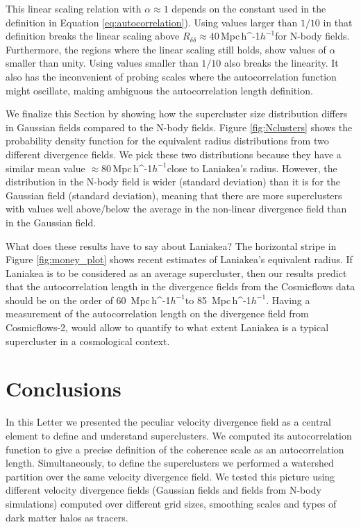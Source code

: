 \documentclass[usenatbib]{mnras}
\newcommand{\Mpch}{\,{\rm Mpc}\,\ifmmode h^{-1}\else $h^{-1}$\fi}
\begin{document}
This linear scaling relation with $\alpha\approx 1$ depends on the constant used in the definition in Equation \ref{eq:autocorrelation}). 
Using values larger than $1/10$ in that definition breaks the linear scaling above $R_{\delta\delta}\approx 40$\Mpch for N-body fields. 
Furthermore, the regions where the linear scaling still holds, show values of $\alpha$ smaller than unity. 
Using values smaller than $1/10$ also breaks the linearity. 
It also has the inconvenient of probing scales where the autocorrelation function might oscillate, making ambiguous the autocorrelation length definition.
    
We finalize this Section by showing how the supercluster size distribution differs in Gaussian fields compared to the N-body fields.
Figure \ref{fig:Nclusters} shows the probability density function for the equivalent radius distributions from two different divergence fields.
We pick these two distributions because they have a similar mean value $\approx80$\Mpch close to Laniakea's radius. 
However, the distribution in the N-body field is wider (standard deviation) than it is for the Gaussian field (standard deviation), meaning that there are more superclusters with values well above/below the average in the non-linear divergence field than in the Gaussian field. 


What does these results have to say about Laniakea?
The horizontal stripe in Figure \ref{fig:money_plot} shows recent estimates of Laniakea's equivalent radius. 
If Laniakea is to be considered as an average supercluster, then our results predict that the autocorrelation length in the divergence fields from the Cosmicflows data should be on the order of 60 \Mpch to 85 \Mpch.
Having a measurement of the autocorrelation length on the divergence field from Cosmicflows-2, would allow to quantify to what extent Laniakea is a typical supercluster in a cosmological context.
 



\section{Conclusions}
\label{sec:conclusion}


In this Letter we presented the peculiar velocity divergence field as a central element to define and understand superclusters.
We computed its autocorrelation function to give a precise definition of the coherence scale as an autocorrelation length. 
Simultaneously, to define the superclusters we performed a watershed partition over the same velocity divergence field. 
We tested this picture using different velocity divergence fields (Gaussian fields and fields from N-body simulations) computed over different grid sizes, smoothing scales and types of dark matter halos as tracers.
\end{document}
